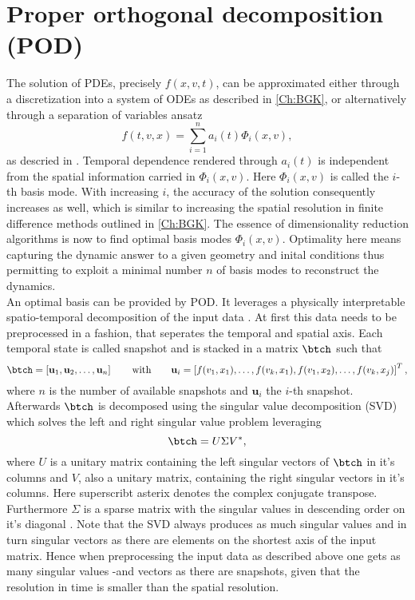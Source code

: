 \section{Proper orthogonal decomposition (POD)}
\label{Sec: POD}
The solution of PDEs, precisely \(f(x,v,t)\), can be approximated either through a discretization into a system of ODEs as described in \cref{Ch:BGK}, or alternatively through a separation of variables ansatz
\begin{equation}
	f(t,v,x) = \sum_{i=1}^n a_i(t)\Phi_i(x,v)\mathrm{,}
\end{equation}  
as descried in \cite{Kutz}. Temporal dependence rendered through \(a_i(t)\) is independent from the spatial information carried in \(\Phi_i(x,v)\). Here \(\Phi_i(x,v)\) is called the \(i\)-th basis mode. With increasing \(i\), the accuracy of the solution consequently increases as well, which is similar to increasing the spatial resolution in finite difference methods outlined in \cref{Ch:BGK}. The essence of dimensionality reduction algorithms is now to find optimal basis modes \(\Phi_i(x,v)\). Optimality here means capturing the dynamic answer to a given geometry and inital conditions thus permitting to exploit a minimal number \(n\) of basis modes to reconstruct the dynamics.\\
An optimal basis can be provided by POD. It leverages a physically interpretable spatio-temporal decomposition of the input data \cite{Kutz}. At first this data needs to be preprocessed in a fashion, that seperates the temporal and spatial axis. Each temporal state is called snapshot and is stacked in a matrix \(\btch\) such that
\begin{equation}
	\btch=\left[ \mathbf{u}_{1},\mathbf{u}_2,\dots,\mathbf{u}_n \right] \qquad \mathrm{with}\qquad \mathbf{u}_i=\left[f(v_1,x_1),\dots,f(v_k,x_1),f(v_1,x_2),\dots,f(v_k,x_j)\right]^T \mathrm{,}
	\label{Eq:PiPOD}
\end{equation}
where \(n\) is the number of available snapshots and \(\mathbf{u}_i\) the \(i\)-th snapshot. Afterwards \(\btch\) is decomposed using the singular value decomposition (SVD) which solves the left and right singular value problem leveraging
\begin{equation}
\btch = U\Sigma V^*\mathrm{,}
\end{equation}
where \(U\) is a unitary matrix containing the left singular vectors of \(\btch\) in it's columns and \(V\), also a unitary matrix, containing the right singular vectors in it's columns. Here superscribt asterix denotes the complex conjugate transpose. Furthermore \(\Sigma\) is a sparse matrix with the singular values in descending order on it's diagonal \cite{Kutz}. Note that the SVD always produces as much singular values and in turn singular vectors as there are elements on the shortest axis of the input matrix. Hence when preprocessing the input data as described above one gets as many singular values -and vectors as there are snapshots, given that the resolution in time is smaller than the spatial resolution.\\
